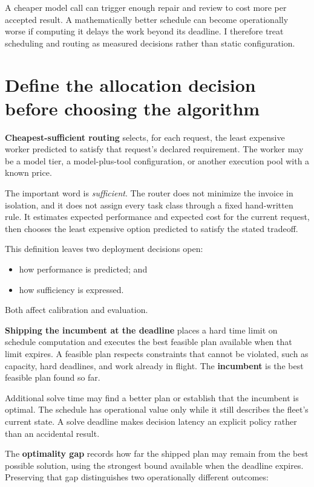 A cheaper model call can trigger enough repair and review to cost more per accepted result. A mathematically better schedule can become operationally worse if computing it delays the work beyond its deadline. I therefore treat scheduling and routing as measured decisions rather than static configuration.

\section{Define the allocation decision before choosing the algorithm}\label{define-the-allocation-decision-before-choosing-the-algorithm}

\textbf{Cheapest-sufficient routing} selects, for each request, the least expensive worker predicted to satisfy that request's declared requirement. The worker may be a model tier, a model-plus-tool configuration, or another execution pool with a known price.

The important word is \emph{sufficient}. The router does not minimize the invoice in isolation, and it does not assign every task class through a fixed hand-written rule. It estimates expected performance and expected cost for the current request, then chooses the least expensive option predicted to satisfy the stated tradeoff.

This definition leaves two deployment decisions open:

\begin{itemize}
\tightlist
\item
  how performance is predicted; and
\item
  how sufficiency is expressed.
\end{itemize}

Both affect calibration and evaluation.

\textbf{Shipping the incumbent at the deadline} places a hard time limit on schedule computation and executes the best feasible plan available when that limit expires. A feasible plan respects constraints that cannot be violated, such as capacity, hard deadlines, and work already in flight. The \textbf{incumbent} is the best feasible plan found so far.

Additional solve time may find a better plan or establish that the incumbent is optimal. The schedule has operational value only while it still describes the fleet's current state. A solve deadline makes decision latency an explicit policy rather than an accidental result.

The \textbf{optimality gap} records how far the shipped plan may remain from the best possible solution, using the strongest bound available when the deadline expires. Preserving that gap distinguishes two operationally different outcomes:

